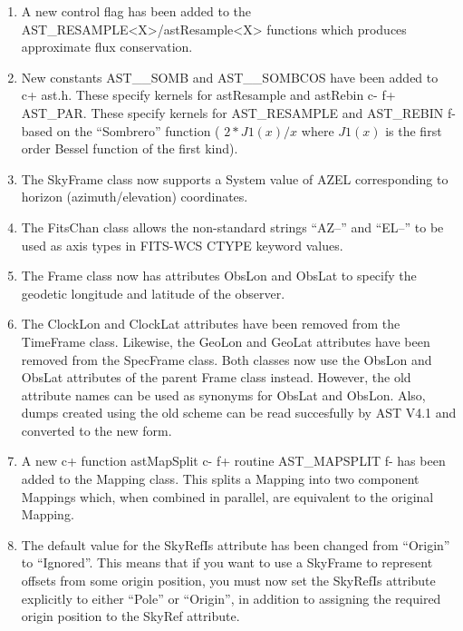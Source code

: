 \documentclass[twoside,11pt]{article}
\begin{document}
\begin{enumerate}

\item A new control flag has been added to the AST\_RESAMPLE<X>/astResample<X> 
functions which produces approximate flux conservation.

\item New constants AST\_\_SOMB and AST\_\_SOMBCOS have been added to 
c+
ast.h. These specify kernels for astResample and astRebin
c-
f+
AST\_PAR. These specify kernels for AST\_RESAMPLE and AST\_REBIN
f-
based on the ``Sombrero'' function ( $2*J1(x)/x$ where $J1(x)$ is the 
first order Bessel function of the first kind).

\item The SkyFrame class now supports a System value of AZEL corresponding
to horizon (azimuth/elevation) coordinates.

\item The FitsChan class allows the non-standard strings ``AZ--'' and
``EL--'' to be used as axis types in FITS-WCS CTYPE keyword values.

\item The Frame class now has attributes ObsLon and ObsLat to specify
the geodetic longitude and latitude of the observer.

\item The ClockLon and ClockLat attributes have been removed from the
TimeFrame class. Likewise, the GeoLon and GeoLat attributes have been 
removed from the SpecFrame class. Both classes now use the ObsLon and
ObsLat attributes of the parent Frame class instead. However, the old
attribute names can be used as synonyms for ObsLat and ObsLon. Also,
dumps created using the old scheme can be read succesfully by AST V4.1
and converted to the new form.

\item A new 
c+
function astMapSplit
c-
f+
routine AST\_MAPSPLIT
f-
has been added to the Mapping class. This splits a Mapping into two component 
Mappings which, when combined in parallel, are equivalent to the original 
Mapping.

\item The default value for the SkyRefIs attribute has been changed from
``Origin'' to ``Ignored''. This means that if you want to use a SkyFrame
to represent offsets from some origin position, you must now set the
SkyRefIs attribute explicitly to either ``Pole'' or ``Origin'', in
addition to assigning the required origin position to the SkyRef attribute.

\end{enumerate}
\end{document}
